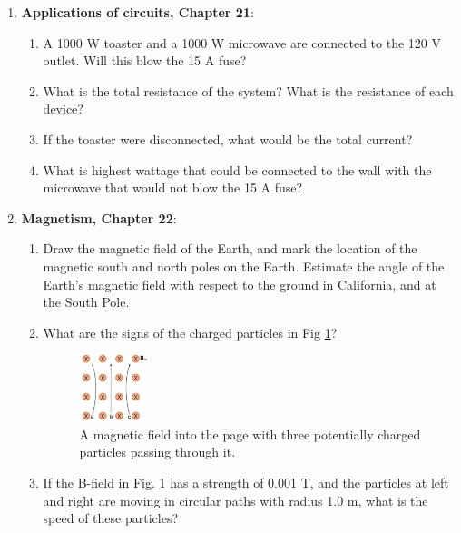 \documentclass[10pt]{article}
\begin{document}
\maketitle

\begin{enumerate}
\item \textbf{Applications of circuits, Chapter 21}:
\begin{enumerate}
\item A 1000 W toaster and a 1000 W microwave are connected to the 120 V outlet.  Will this blow the 15 A fuse?
\item What is the total resistance of the system?  What is the resistance of each device?
\item If the toaster were disconnected, what would be the total current?
\item What is highest wattage that could be connected to the wall with the microwave that would not blow the 15 A fuse? \\ \vspace{3cm}
\end{enumerate}
\item \textbf{Magnetism, Chapter 22}:
\begin{enumerate}
\item Draw the magnetic field of the Earth, and mark the location of the magnetic south and north poles on the Earth.  Estimate the angle of the Earth's magnetic field with respect to the ground in California, and at the South Pole. \\ \vspace{3cm}
\item What are the signs of the charged particles in Fig \ref{fig:magfield}?
\begin{figure}[ht]
\centering
\includegraphics[width=0.2\textwidth]{magfield.png}
\caption{\label{fig:magfield} A magnetic field into the page with three potentially charged particles passing through it.}
\end{figure}
\item If the B-field in Fig. \ref{fig:magfield} has a strength of 0.001 T, and the particles at left and right are moving in circular paths with radius 1.0 m, what is the speed of these particles?
\end{enumerate} \vspace{2cm}

\end{enumerate}
\end{document}

